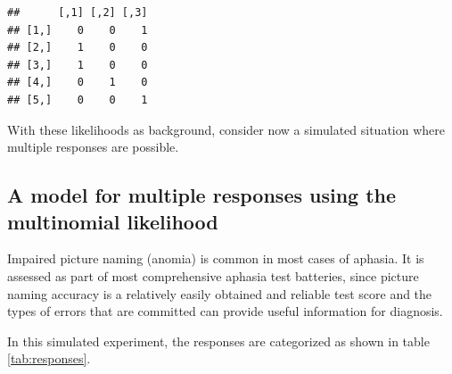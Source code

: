 \documentclass[12pt,]{krantz}
\theoremstyle{definition}
\theoremstyle{definition}
\theoremstyle{definition}
\theoremstyle{remark}
\begin{document}
\begin{verbatim}
##      [,1] [,2] [,3]
## [1,]    0    0    1
## [2,]    1    0    0
## [3,]    1    0    0
## [4,]    0    1    0
## [5,]    0    0    1
\end{verbatim}

With these likelihoods as background, consider now a simulated situation
where multiple responses are possible.

\subsection{A model for multiple responses using the multinomial
likelihood}\label{sec:mult}

Impaired picture naming (anomia) is common in most cases of aphasia. It
is assessed as part of most comprehensive aphasia test batteries, since
picture naming accuracy is a relatively easily obtained and reliable
test score and the types of errors that are committed can provide useful
information for diagnosis.

In this simulated experiment, the responses are categorized as shown in
table \ref{tab:responses}.
\end{document}
